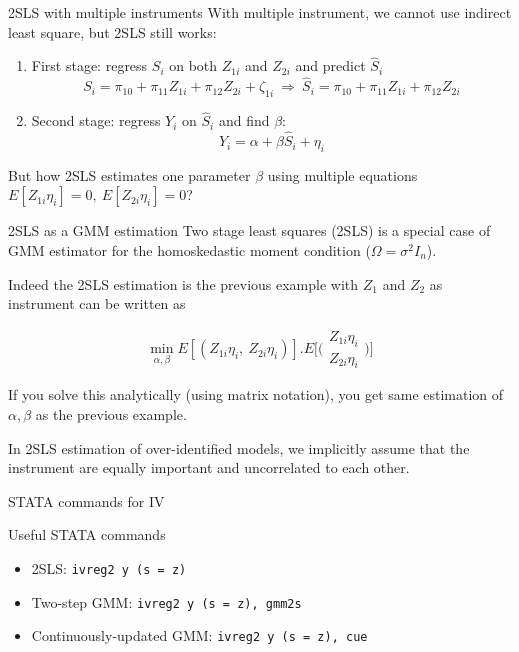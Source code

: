 \documentclass{beamer}
\begin{document}
\begin{frame}{2SLS with multiple instruments}
With multiple instrument, we cannot use indirect least square, but 2SLS still works:
\begin{enumerate}
\item First stage: regress $S_i$ on both $Z_{1i}$ and $Z_{2i}$ and predict $\hat{S}_i$
\[S_i = \pi_{10} + \pi_{11}Z_{1i} + \pi_{12}Z_{2i} + \zeta_{1i}\ \Rightarrow \ \hat{S}_i = \pi_{10} + \pi_{11}Z_{1i} + \pi_{12}Z_{2i}\] 
\item Second stage: regress $Y_i$ on $\hat{S}_i$ and find $\beta$: \[Y_i = \alpha + \beta \hat{S}_i + \eta_i\]
\end{enumerate}

But how 2SLS estimates one parameter $\beta$ using multiple equations $E[Z_{1i}\eta_i]=0 ,\ E[Z_{2i}\eta_i]=0$? 
\end{frame}

\begin{frame}{2SLS as a GMM estimation}
Two stage least squares (2SLS) is a special case of GMM estimator for the homoskedastic moment condition ($\Omega=\sigma^2I_n$).\bigskip

Indeed the 2SLS estimation is the previous example with $Z_1$ and $Z_2$ as instrument can be written as

\[ \min_{\alpha, \beta} E[(Z_{1i}\eta_i,\ Z_{2i}\eta_i)].E\Big[\Big(\begin{array}{c}
Z_{1i}\eta_i\\ Z_{2i}\eta_i
\end{array}\Big)\Big] \] 

If you solve this analytically (using matrix notation), you get same estimation of $\alpha , \beta$ as the previous example.\bigskip

In 2SLS estimation of over-identified models, we implicitly assume that the instrument are equally important and uncorrelated to each other.
\end{frame}


\begin{frame}{STATA commands for IV}

Useful STATA commands
\begin{itemize}
\item 2SLS: \texttt{ivreg2 y (s = z) } 
\item Two-step GMM: \texttt{ivreg2 y (s = z),  gmm2s} 
\item Continuously-updated GMM: \texttt{ivreg2 y (s = z),  cue} 
\end{itemize}

\end{frame}
\end{document}
